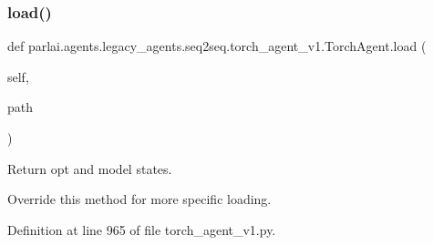 \subsubsection{\texorpdfstring{load()}{load()}}
{\footnotesize\ttfamily def parlai.\+agents.\+legacy\+\_\+agents.\+seq2seq.\+torch\+\_\+agent\+\_\+v1.\+Torch\+Agent.\+load (\begin{DoxyParamCaption}\item[{}]{self,  }\item[{}]{path }\end{DoxyParamCaption})}

\begin{DoxyVerb}Return opt and model states.

Override this method for more specific loading.
\end{DoxyVerb}
 

Definition at line 965 of file torch\+\_\+agent\+\_\+v1.\+py.




